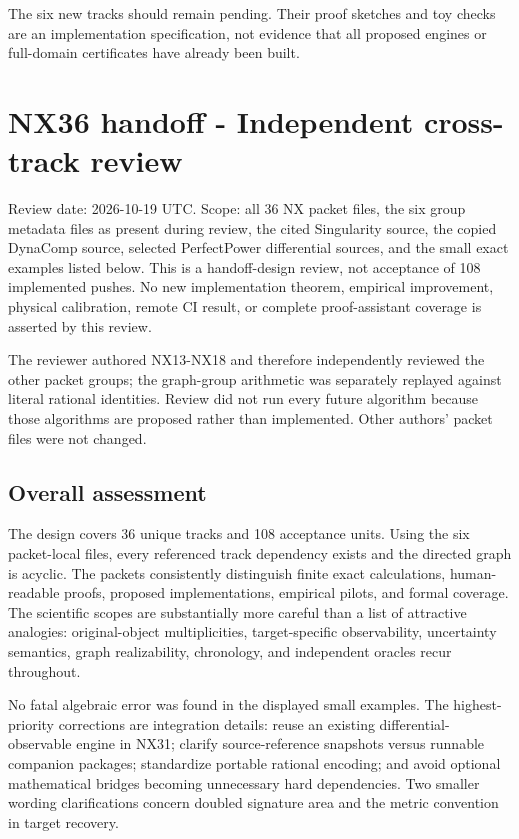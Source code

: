 \documentclass[
  11pt,
  a4paper,
]{report}
\let\nxtexttt\texttt
\renewcommand{\texttt}[1]{\nxtexttt{\seqsplit{#1}}}
\begin{document}
The six new tracks should remain pending. Their proof sketches and toy
checks are an implementation specification, not evidence that all
proposed engines or full-domain certificates have already been built.

\hypertarget{nx36-handoff---independent-cross-track-review}{%
\chapter{NX36 handoff - Independent cross-track
review}\label{nx36-handoff---independent-cross-track-review}}

Review date: 2026-10-19 UTC. Scope: all 36 NX packet files, the six
group metadata files as present during review, the cited Singularity
source, the copied DynaComp source, selected PerfectPower differential
sources, and the small exact examples listed below. This is a
handoff-design review, not acceptance of 108 implemented pushes. No new
implementation theorem, empirical improvement, physical calibration,
remote CI result, or complete proof-assistant coverage is asserted by
this review.

The reviewer authored NX13-NX18 and therefore independently reviewed the
other packet groups; the graph-group arithmetic was separately replayed
against literal rational identities. Review did not run every future
algorithm because those algorithms are proposed rather than implemented.
Other authors' packet files were not changed.

\hypertarget{overall-assessment}{%
\section{Overall assessment}\label{overall-assessment}}

The design covers 36 unique tracks and 108 acceptance units. Using the
six packet-local \texttt{group\_*.json} files, every referenced track
dependency exists and the directed graph is acyclic. The packets
consistently distinguish finite exact calculations, human-readable
proofs, proposed implementations, empirical pilots, and formal coverage.
The scientific scopes are substantially more careful than a list of
attractive analogies: original-object multiplicities, target-specific
observability, uncertainty semantics, graph realizability, chronology,
and independent oracles recur throughout.

No fatal algebraic error was found in the displayed small examples. The
highest-priority corrections are integration details: reuse an existing
differential-observable engine in NX31; clarify source-reference
snapshots versus runnable companion packages; standardize portable
rational encoding; and avoid optional mathematical bridges becoming
unnecessary hard dependencies. Two smaller wording clarifications
concern doubled signature area and the metric convention in target
recovery.
\end{document}
